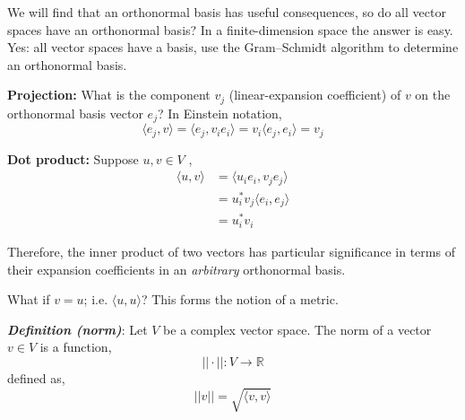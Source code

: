 \documentclass[12pt]{article}
\numberwithin{equation}{section}
\begin{document}
We will find that an orthonormal basis has useful consequences, so do all vector spaces have an orthonormal basis? In a finite-dimension space the answer is easy. Yes: all vector spaces have a basis, use the Gram–Schmidt algorithm to determine an orthonormal basis.

\textbf{Projection:} What is the component $ v_j $ (linear-expansion coefficient) of $ v $ on the orthonormal basis vector $ e_j $? In Einstein notation,
\begin{equation}
		\langle e_j, v\rangle = \langle e_j, v_ie_i\rangle = v_i\langle e_j, e_i\rangle = v_j
\end{equation}

\textbf{Dot product:} Suppose $ u,v\in V $ ,
\begin{align}
	\langle u,v\rangle &= \langle u_ie_i,v_je_j\rangle \\
	&= u_i^* v_j\langle e_i, e_j \rangle\\
	&= u_i^* v_i
\end{align}

Therefore, the inner product of two vectors has particular significance in terms of their expansion coefficients in an \textit{arbitrary} orthonormal basis. 

What if $ v=u $; i.e. $ \langle u,u\rangle $? This forms the notion of a metric.

	\textbf{\textit{Definition (norm)}}: Let $ V $ be a complex vector space. The norm of a vector $ v\in V $ is a function,
	\begin{equation}
			||\cdot ||: V\to \mathbb{R}
	\end{equation}
	defined as,
	\begin{equation}
			||v|| = \sqrt{\langle v, v\rangle}
	\end{equation}
\end{document}
